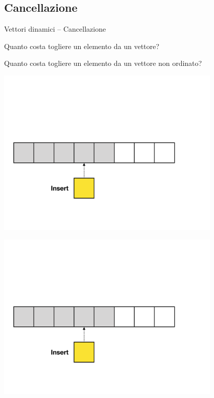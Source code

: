 \subsection{Cancellazione}

\begin{frame}{Vettori dinamici -- Cancellazione}

\vspace{-9pt}
\begin{myboxtitle}[Domande]
\BI
\item Quanto costa togliere un elemento da un vettore?
\item Quanto costa togliere un elemento da un vettore \alert{non ordinato}?
\EI
\end{myboxtitle}

\begin{overprint}
\centerline{\includegraphics[width=0.8\textwidth,page=6]{append-insert.pdf}}
\centerline{\includegraphics[width=0.8\textwidth,page=7]{append-insert.pdf}}

\end{overprint}
\end{frame}
